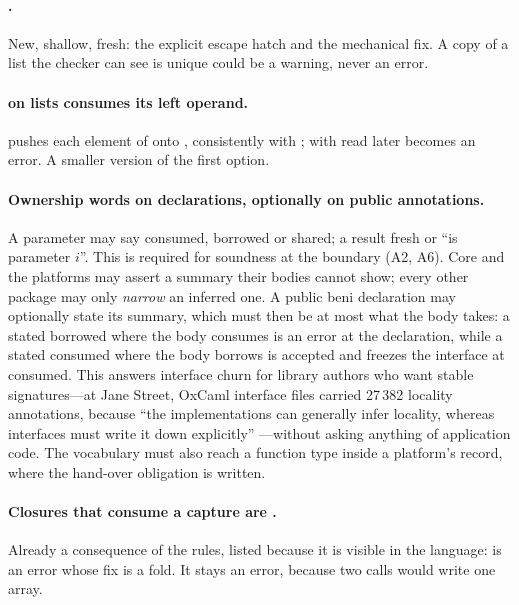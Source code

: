 \paragraph{.} New, shallow, fresh: the explicit escape hatch and the mechanical fix. A
copy of a list the checker can see is unique could be a warning, never an error.

\paragraph{\code{++} on lists consumes its left operand.}  pushes each element of
 onto , consistently with \code{[ …xs, …ys ]};  with  read later
becomes an error. A smaller version of the first option.

\paragraph{Ownership words on  declarations, optionally on public annotations.} A
 parameter may say consumed, borrowed or shared; a result fresh or ``is parameter $i$''.
This is required for soundness at the boundary (A2, A6). Core and the platforms may assert a summary
their bodies cannot show; every other package may only \emph{narrow} an inferred one. A public beni
declaration may optionally state its summary, which must then be at most what the body takes: a stated
borrowed where the body consumes is an error at the declaration, while a stated consumed where the body
borrows is accepted and freezes the interface at consumed. This answers interface churn for library
authors who want stable signatures---at Jane Street, OxCaml interface files carried 27\,382 locality
annotations, because ``the implementations can generally infer locality, whereas interfaces must write
it down explicitly''
\citep[\S7]{lorenzen2024oxidizing}---without asking anything of application code. The vocabulary must
also reach a function type inside a platform's record, where the hand-over obligation is written.

\paragraph{Closures that consume a capture are .} Already a consequence of the rules, listed
because it is visible in the language:  is an error whose fix is
a fold. It stays an error, because two calls would write one array.

